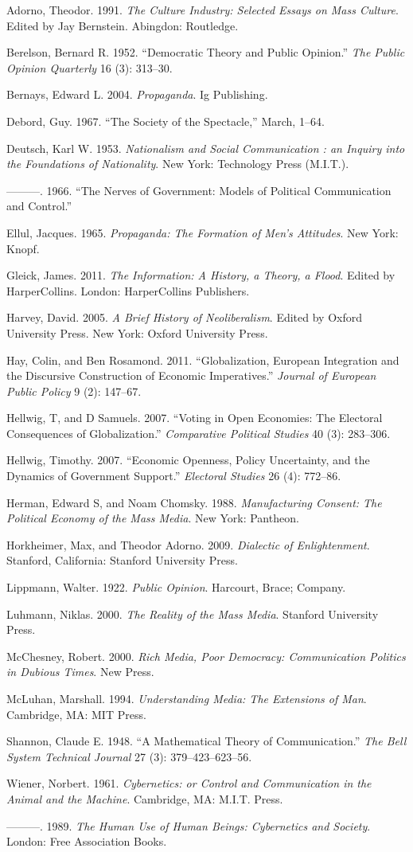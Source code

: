 \documentclass[12pt,book]{article}
\begin{document}
Adorno, Theodor. 1991. \emph{The Culture Industry: Selected Essays on
Mass Culture}. Edited by Jay Bernstein. Abingdon: Routledge.

Berelson, Bernard R. 1952. ``Democratic Theory and Public Opinion.''
\emph{The Public Opinion Quarterly} 16 (3): 313--30.

Bernays, Edward L. 2004. \emph{Propaganda}. Ig Publishing.

Debord, Guy. 1967. ``The Society of the Spectacle,'' March, 1--64.

Deutsch, Karl W. 1953. \emph{Nationalism and Social Communication : an
Inquiry into the Foundations of Nationality}. New York: Technology Press
(M.I.T.).

---------. 1966. ``The Nerves of Government: Models of Political
Communication and Control.''

Ellul, Jacques. 1965. \emph{Propaganda: The Formation of Men's
Attitudes}. New York: Knopf.

Gleick, James. 2011. \emph{The Information: A History, a Theory, a
Flood}. Edited by HarperCollins. London: HarperCollins Publishers.

Harvey, David. 2005. \emph{A Brief History of Neoliberalism}. Edited by
Oxford University Press. New York: Oxford University Press.

Hay, Colin, and Ben Rosamond. 2011. ``Globalization, European
Integration and the Discursive Construction of Economic Imperatives.''
\emph{Journal of European Public Policy} 9 (2): 147--67.

Hellwig, T, and D Samuels. 2007. ``Voting in Open Economies: The
Electoral Consequences of Globalization.'' \emph{Comparative Political
Studies} 40 (3): 283--306.

Hellwig, Timothy. 2007. ``Economic Openness, Policy Uncertainty, and the
Dynamics of Government Support.'' \emph{Electoral Studies} 26 (4):
772--86.

Herman, Edward S, and Noam Chomsky. 1988. \emph{Manufacturing Consent:
The Political Economy of the Mass Media}. New York: Pantheon.

Horkheimer, Max, and Theodor Adorno. 2009. \emph{Dialectic of
Enlightenment}. Stanford, California: Stanford University Press.

Lippmann, Walter. 1922. \emph{Public Opinion}. Harcourt, Brace; Company.

Luhmann, Niklas. 2000. \emph{The Reality of the Mass Media}. Stanford
University Press.

McChesney, Robert. 2000. \emph{Rich Media, Poor Democracy: Communication
Politics in Dubious Times}. New Press.

McLuhan, Marshall. 1994. \emph{Understanding Media: The Extensions of
Man}. Cambridge, MA: MIT Press.

Shannon, Claude E. 1948. ``A Mathematical Theory of Communication.''
\emph{The Bell System Technical Journal} 27 (3): 379--423--623--56.

Wiener, Norbert. 1961. \emph{Cybernetics: or Control and Communication
in the Animal and the Machine}. Cambridge, MA: M.I.T. Press.

---------. 1989. \emph{The Human Use of Human Beings: Cybernetics and
Society}. London: Free Association Books.
\end{document}
